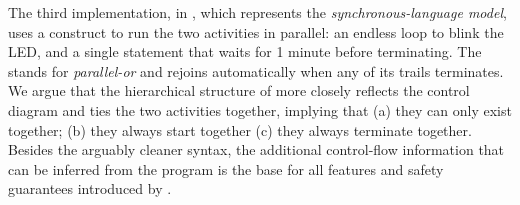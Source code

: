 
The third implementation, in \CEU, which represents the 
\emph{synchronous-language model}, uses a  construct to run the 
two activities in parallel:
an endless loop to blink the LED, and a single statement that waits for 1 
minute before terminating.
The  stands for \emph{parallel-or} and rejoins automatically when 
any of its trails terminates.
%
We argue that the hierarchical structure of \CEU more closely reflects the 
control diagram and ties the two activities together, implying that
(a) they can only exist together;
(b) they always start together
(c) they always terminate together.
%
Besides the arguably cleaner syntax, the additional control-flow information 
that can be inferred from the program is the base for all features and safety 
guarantees introduced by \CEU.

